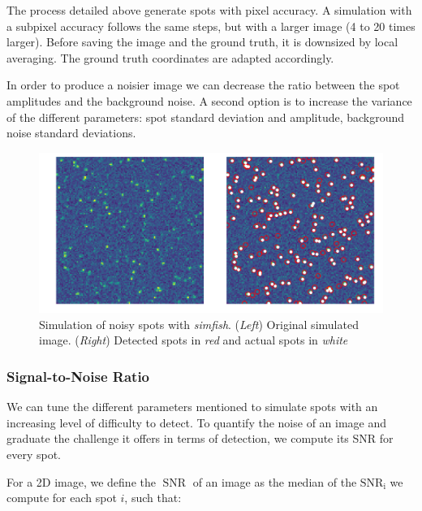
The process detailed above generate spots with pixel accuracy.
A simulation with a subpixel accuracy follows the same steps, but with a larger image (4 to 20 times larger).
Before saving the image and the ground truth, it is downsized by local averaging.
The ground truth coordinates are adapted accordingly.

In order to produce a noisier image we can decrease the ratio between the spot amplitudes and the background noise.
A second option is to increase the variance of the different parameters: spot standard deviation and amplitude, background noise standard deviations.

\begin{figure}[]
    \centering
    \includegraphics[width=1\textwidth]{figures/chapter2/plot_spot_detection}
    \caption[Simulation of noisy spots with \emph{simfish}]{Simulation of noisy spots with \emph{simfish}.
	(\textit{Left}) Original simulated image.
	(\textit{Right}) Detected spots in \textit{red} and actual spots in \textit{white}}
    \label{fig:spot_detection_high_noise}
\end{figure}

\subsubsection{Signal-to-Noise Ratio}

We can tune the different parameters mentioned to simulate spots with an increasing level of difficulty to detect.
To quantify the noise of an image and graduate the challenge it offers in terms of detection, we compute its \ac{SNR} for every spot.

\noindent
For a 2D image, we define the $\operatorname{SNR}$ of an image as the median of the $\operatorname{SNR_i}$ we compute for each spot $i$, such that:

